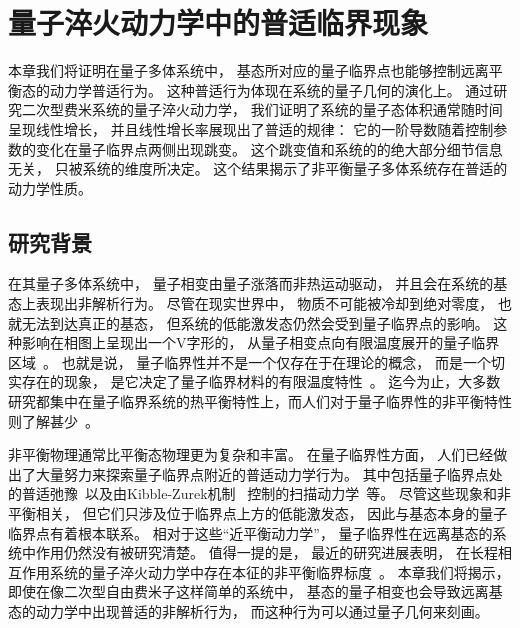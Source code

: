 
\chapter{量子淬火动力学中的普适临界现象}

	本章我们将证明在量子多体系统中， 基态所对应的量子临界点也能够控制远离平衡态的动力学普适行为。
	这种普适行为体现在系统的量子几何的演化上。
	通过研究二次型费米系统的量子淬火动力学， 我们证明了系统的量子态体积通常随时间呈现线性增长， 并且线性增长率展现出了普适的规律： 它的一阶导数随着控制参数的变化在量子临界点两侧出现跳变。
	这个跳变值和系统的的绝大部分细节信息无关， 只被系统的维度所决定。
	这个结果揭示了非平衡量子多体系统存在普适的动力学性质。

	\section{研究背景}
	
		在其量子多体系统中， 量子相变由量子涨落而非热运动驱动， 并且会在系统的基态上表现出非解析行为。
		尽管在现实世界中， 物质不可能被冷却到绝对零度， 也就无法到达真正的基态， 但系统的低能激发态仍然会受到量子临界点的影响。
		这种影响在相图上呈现出一个V字形的， 从量子相变点向有限温度展开的量子临界区域~\cite{Sachdev1999}。
		也就是说， 量子临界性并不是一个仅存在于在理论的概念， 而是一个切实存在的现象， 是它决定了量子临界材料的有限温度特性~\cite{Coleman2005}。
		迄今为止，大多数研究都集中在量子临界系统的热平衡特性上，而人们对于量子临界性的非平衡特性则了解甚少~\cite{Torre2010}。
		
		非平衡物理通常比平衡态物理更为复杂和丰富。
		在量子临界性方面， 人们已经做出了大量努力来探索量子临界点附近的普适动力学行为。
		其中包括量子临界点处的普适弛豫~\cite{Sachdev1997}以及由Kibble-Zurek机制~\cite{Kibble1976,Zurek1985} 控制的扫描动力学~\cite{Zurek2005,Dziarmaga2005,Damski2005}等。
		尽管这些现象和非平衡相关， 但它们只涉及位于临界点上方的低能激发态， 因此与基态本身的量子临界点有着根本联系。
		相对于这些“近平衡动力学”， 量子临界性在远离基态的系统中作用仍然没有被研究清楚。
		值得一提的是， 最近的研究进展表明， 在长程相互作用系统的量子淬火动力学中存在本征的非平衡临界标度~\cite{Titum2020,De2023}。
		本章我们将揭示， 即使在像二次型自由费米子这样简单的系统中， 基态的量子相变也会导致远离基态的动力学中出现普适的非解析行为， 而这种行为可以通过量子几何来刻画。
		
